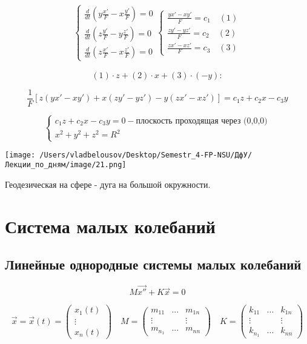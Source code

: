 \documentclass[12pt, a4paper]{report}
\begin{document}
\[
\begin{aligned}
    \begin{cases}
        \displaystyle \frac{d}{dt } \left( y \frac{x' }{F } - x \frac{y ' }{F}  \right) = 0 \\
        \displaystyle \frac{d}{dt } \left( z \frac{y' }{F } - y \frac{z' }{F}  \right) = 0 \\
        \displaystyle \frac{d}{dt } \left( z \frac{x' }{F } - x \frac{z ' }{F}  \right) = 0 
    \end{cases} 
    \begin{cases}
        \displaystyle \frac{y x' - x y ' }{F } = c_1  \quad (1)\\
        \displaystyle \frac{z y' - y z ' }{F } = c_2  \quad (2)\\ 
        \displaystyle \frac{z x' - x z ' }{F } = c_3 \quad (3)
    \end{cases}
\end{aligned}\] 



\[ (1 )  \cdot z + (2)\cdot x + (3 ) \cdot (-y) : \]

\[ \frac{1}{F} \left[ z(y x' - x y ' ) + x (z y' - y z ' ) - y(z x' - x z ' ) \right] = c_1 z + c_2 x -  c_3 y  \] 

\[ \begin{cases}
    c_1 z + c_2 x -  c_3 y =  0 - \text{плоскость проходящая через (0,0,0)} \\
    x ^2 + y ^2 + z ^2 = R ^2 
\end{cases}  \] 

\begin{center}
    \texttt{[image: /Users/vladbelousov/Desktop/Semestr\_4-FP-NSU/ДфУ/Лекции\_по\_дням/image/21.png]}
\end{center}

Геодезическая на сфере - дуга на большой окружности.

\chapter{Система малых колебаний}

\section{Линейные однородные системы малых колебаний}

\[ M \vec{x''}  + K \vec{x}  = 0  \] 

\[ \vec{x }  =\vec{x } (t) = \begin{pmatrix}
x_1( t)\\
\vdots\\
x_n (t)
\end{pmatrix} \quad  M =\begin{pmatrix}
m_{11} & ... & m_{1n}\\
\vdots &  & \vdots\\
m_{n_1} & ... & m_{nn} 
\end{pmatrix} \quad K=\begin{pmatrix}
    k_{11} & ... & k_{1n}\\
    \vdots &  & \vdots\\
    k_{n_1} & ... & k_{nn} 
\end{pmatrix}  \]
\end{document}
